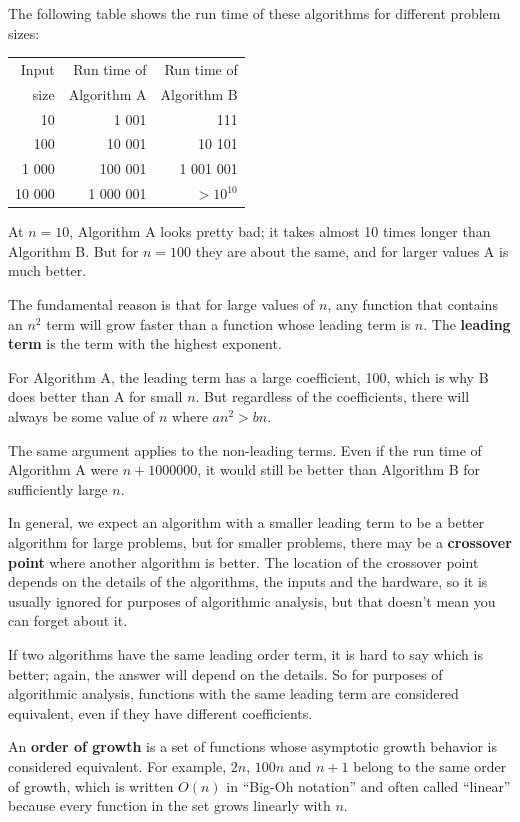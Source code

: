 \documentclass[10pt]{book}
\begin{document}
The following table shows the run time of these algorithms
for different problem sizes:

\begin{tabular}{|r|r|r|}
\hline
Input     &   Run time of     & Run time of \\
size      &   Algorithm A     & Algorithm B \\
\hline
10      &   1 001           & 111         \\
100      &   10 001           & 10 101         \\
1 000      &   100 001           & 1 001 001         \\
10 000      &   1 000 001           & $> 10^{10}$         \\
\hline
\end{tabular}

At $n=10$, Algorithm A looks pretty bad; it takes almost 10 times
longer than Algorithm B.  But for $n=100$ they are about the same, and
for larger values A is much better.

The fundamental reason is that for large values of $n$, any function
that contains an $n^2$ term will grow faster than a function whose
leading term is $n$.  The {\bf leading term} is the term with the
highest exponent.

For Algorithm A, the leading term has a large coefficient, 100, which
is why B does better than A for small $n$.  But regardless of the
coefficients, there will always be some value of $n$ where $a n^2 > b
n$.

The same argument applies to the non-leading terms.  Even if the run
time of Algorithm A were $n + 1000000$, it would still be better than
Algorithm B for sufficiently large $n$.

In general, we expect an algorithm with a smaller leading term to be a
better algorithm for large problems, but for smaller problems, there
may be a {\bf crossover point} where another algorithm is better.  The
location of the crossover point depends on the details of the
algorithms, the inputs and the hardware, so it is usually ignored for
purposes of algorithmic analysis, but that doesn't mean you can forget
about it.

If two algorithms have the same leading order term, it is hard to say
which is better; again, the answer will depend on the details.  So for
purposes of algorithmic analysis, functions with the same leading term
are considered equivalent, even if they have different coefficients.

An {\bf order of growth} is a set of functions whose asymptotic growth
behavior is considered equivalent.  For example, $2n$, $100n$ and $n +
1$ belong to the same order of growth, which is written $O(n)$ in
``Big-Oh notation'' and often called ``linear'' because every function
in the set grows linearly with $n$.
\end{document}
